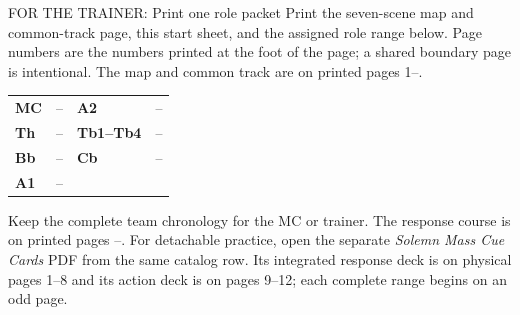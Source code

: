 \begin{coachbox}{FOR THE TRAINER: Print one role packet}
Print the seven-scene map and common-track page, this start sheet, and the
assigned role range below. Page numbers are the numbers printed at the foot of
the page; a shared boundary page is intentional. The map and common track are
on printed pages 1--\pageref{solemn-common-track}.

\begin{center}
\small
\begin{tabularx}{\linewidth}{@{}>{\bfseries}l l >{\bfseries}l X@{}}
MC & \pageref{solemn-role:mc:first}--\pageref{solemn-role:mc:last} &
A2 & \pageref{solemn-role:a2:first}--\pageref{solemn-role:a2:last}\\
Th & \pageref{solemn-role:th:first}--\pageref{solemn-role:th:last} &
Tb1--Tb4 & \pageref{solemn-role:tb:first}--\pageref{solemn-role:tb:last}\\
Bb & \pageref{solemn-role:bb:first}--\pageref{solemn-role:bb:last} &
Cb & \pageref{solemn-role:cb:first}--\pageref{solemn-role:cb:last}\\
A1 & \pageref{solemn-role:a1:first}--\pageref{solemn-role:a1:last} & & \\
\end{tabularx}
\end{center}

Keep the complete team chronology for the MC or trainer. The response course
is on printed pages \pageref{course:first}--\pageref{course:last}. For
detachable practice, open the separate \emph{Solemn Mass Cue Cards} PDF from
the same catalog row. Its integrated response deck is on physical pages 1--8
and its action deck is on pages 9--12; each complete range begins on an odd
page.
\end{coachbox}

